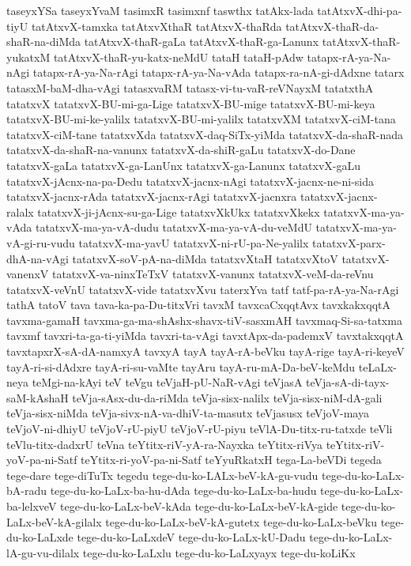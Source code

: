 {taseyxYSa
taseyxYvaM
tasimxR
tasimxnf
taswthx
tatAkx-lada
tatAtxvX-dhi-pa-tiyU
tatAtxvX-tamxka
tatAtxvXthaR
tatAtxvX-thaRda
tatAtxvX-thaR-da-shaR-na-diMda
tatAtxvX-thaR-gaLa
tatAtxvX-thaR-ga-Lanunx
tatAtxvX-thaR-yukatxM
tatAtxvX-thaR-yu-katx-neMdU
tataH
tataH-pAdw
tatapx-rA-ya-Na-nAgi
tatapx-rA-ya-Na-rAgi
tatapx-rA-ya-Na-vAda
tatapx-ra-nA-gi-dAdxne
tatarx
tatasxM-baM-dha-vAgi
tatasxvaRM
tatasx-vi-tu-vaR-reVNayxM
tatatxthA
tatatxvX
tatatxvX-BU-mi-ga-Lige
tatatxvX-BU-mige
tatatxvX-BU-mi-keya
tatatxvX-BU-mi-ke-yalilx
tatatxvX-BU-mi-yalilx
tatatxvXM
tatatxvX-ciM-tana
tatatxvX-ciM-tane
tatatxvXda
tatatxvX-daq-SiTx-yiMda
tatatxvX-da-shaR-nada
tatatxvX-da-shaR-na-vanunx
tatatxvX-da-shiR-gaLu
tatatxvX-do-Dane
tatatxvX-gaLa
tatatxvX-ga-LanUnx
tatatxvX-ga-Lanunx
tatatxvX-gaLu
tatatxvX-jAcnx-na-pa-Dedu
tatatxvX-jacnx-nAgi
tatatxvX-jacnx-ne-ni-sida
tatatxvX-jacnx-rAda
tatatxvX-jacnx-rAgi
tatatxvX-jacnxra
tatatxvX-jacnx-ralalx
tatatxvX-ji-jAcnx-su-ga-Lige
tatatxvXkUkx
tatatxvXkekx
tatatxvX-ma-ya-vAda
tatatxvX-ma-ya-vA-dudu
tatatxvX-ma-ya-vA-du-veMdU
tatatxvX-ma-ya-vA-gi-ru-vudu
tatatxvX-ma-yavU
tatatxvX-ni-rU-pa-Ne-yalilx
tatatxvX-parx-dhA-na-vAgi
tatatxvX-soV-pA-na-diMda
tatatxvXtaH
tatatxvXtoV
tatatxvX-vanenxV
tatatxvX-va-ninxTeTxV
tatatxvX-vanunx
tatatxvX-veM-da-reVnu
tatatxvX-veVnU
tatatxvX-vide
tatatxvXvu
taterxYva
tatf
tatf-pa-rA-ya-Na-rAgi
tathA
tatoV
tava
tava-ka-pa-Du-titxVri
tavxM
tavxcaCxqqtAvx
tavxkakxqqtA
tavxma-gamaH
tavxma-ga-ma-shAshx-shavx-tiV-sasxmAH
tavxmaq-Si-sa-tatxma
tavxmf
tavxri-ta-ga-ti-yiMda
tavxri-ta-vAgi
tavxtApx-da-pademxV
tavxtakxqqtA
tavxtapxrX-sA-dA-namxyA
tavxyA
tayA
tayA-rA-beVku
tayA-rige
tayA-ri-keyeV
tayA-ri-si-dAdxre
tayA-ri-su-vaMte
tayAru
tayA-ru-mA-Da-beV-keMdu
teLaLx-neya
teMgi-na-kAyi
teV
teVgu
teVjaH-pU-NaR-vAgi
teVjasA
teVja-sA-di-tayx-saM-kAshaH
teVja-sAsx-du-da-riMda
teVja-sisx-nalilx
teVja-sisx-niM-dA-gali
teVja-sisx-niMda
teVja-sivx-nA-va-dhiV-ta-masutx
teVjasusx
teVjoV-maya
teVjoV-ni-dhiyU
teVjoV-rU-piyU
teVjoV-rU-piyu
teVlA-Du-titx-ru-tatxde
teVli
teVlu-titx-dadxrU
teVna
teYtitx-riV-yA-ra-Nayxka
teYtitx-riVya
teYtitx-riV-yoV-pa-ni-Satf
teYtitx-ri-yoV-pa-ni-Satf
teYyuRkatxH
tega-La-beVDi
tegeda
tege-dare
tege-diTuTx
tegedu
tege-du-ko-LALx-beV-kA-gu-vudu
tege-du-ko-LaLx-bA-radu
tege-du-ko-LaLx-ba-hu-dAda
tege-du-ko-LaLx-ba-hudu
tege-du-ko-LaLx-ba-lelxveV
tege-du-ko-LaLx-beV-kAda
tege-du-ko-LaLx-beV-kA-gide
tege-du-ko-LaLx-beV-kA-gilalx
tege-du-ko-LaLx-beV-kA-gutetx
tege-du-ko-LaLx-beVku
tege-du-ko-LaLxde
tege-du-ko-LaLxdeV
tege-du-ko-LaLx-kU-Dadu
tege-du-ko-LaLx-lA-gu-vu-dilalx
tege-du-ko-LaLxlu
tege-du-ko-LaLxyayx
tege-du-koLiKx
}
